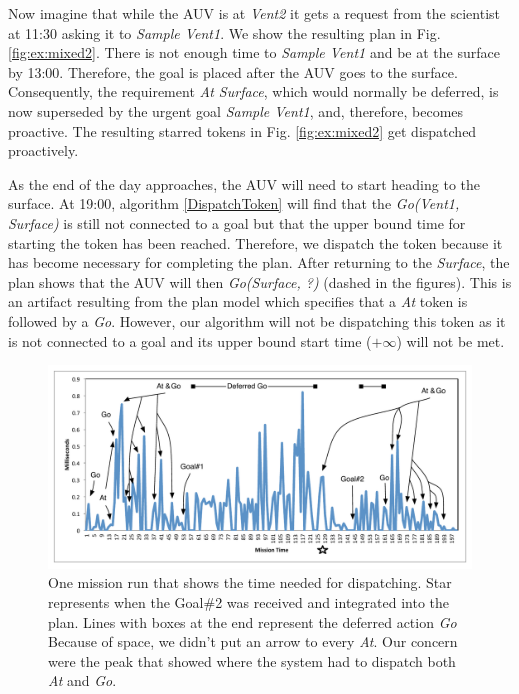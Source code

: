 Now imagine that while the AUV is at {\em Vent2} it gets a
request from the scientist at 11:30 asking it to {\em Sample Vent1}. We show the resulting plan in
Fig. \ref{fig:ex:mixed2}. There is not enough time to {\em Sample Vent1} and be at the surface by
13:00. Therefore, the goal is placed after the AUV goes to the surface.  Consequently, the requirement
{\em At Surface},  which would normally be deferred, is now superseded by the urgent goal {\em Sample Vent1},
and, therefore, becomes proactive. The resulting starred tokens in Fig. \ref{fig:ex:mixed2} get dispatched 
proactively.

As the end of the day approaches, the AUV will need to start heading
to the surface. At 19:00, algorithm \ref{DispatchToken} will find that the {\em Go(Vent1,
Surface)} is still not connected to a goal but that the upper bound time
for starting the token has been reached. Therefore, we dispatch
the token because it has become necessary for completing the plan.
After returning to the {\em Surface}, the plan shows that the AUV will then {\em
Go(Surface, ?)} (dashed in the figures). This is an artifact resulting
from the plan model which specifies that a {\em At} token is followed by a {\em Go}. 
However, our algorithm will not be dispatching this token as 
it is not connected to a goal and its upper bound start time
($+\infty$) will not be met.

\begin{figure}
\centering
\includegraphics[width=\columnwidth]{figs/example_run.pdf}
\caption{\small  One mission run that shows the time needed for dispatching. Star represents when the Goal\#2 was
received and integrated into the plan. Lines with boxes at the end represent the deferred action {\em Go} Because of space,
we didn't put an arrow to every {\em At}. Our concern were the peak that showed where the system had to dispatch both {\em At} and {\em Go}. } 
  \label{fig:example_run}
\end{figure}

